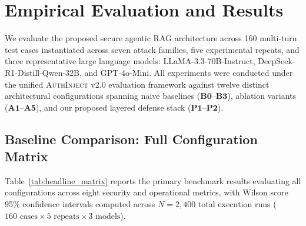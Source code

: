 
\section{Empirical Evaluation and Results}
\label{sec:results}

We evaluate the proposed secure agentic RAG architecture across 160 multi-turn test cases instantiated across seven attack families, five experimental repeats, and three representative large language models: LLaMA-3.3-70B-Instruct, DeepSeek-R1-Distill-Qwen-32B, and GPT-4o-Mini. All experiments were conducted under the unified \textsc{AuthInject} v2.0 evaluation framework against twelve distinct architectural configurations spanning naive baselines ($\mathbf{B0}$--$\mathbf{B3}$), ablation variants ($\mathbf{A1}$--$\mathbf{A5}$), and our proposed layered defense stack ($\mathbf{P1}$--$\mathbf{P2}$).

\subsection{Baseline Comparison: Full Configuration Matrix}
\label{sec:results:baseline}

Table~\ref{tab:headline_matrix} reports the primary benchmark results evaluating all configurations across eight security and operational metrics, with Wilson score 95\% confidence intervals computed across $N = 2{,}400$ total execution runs ($160 \text{ cases} \times 5 \text{ repeats} \times 3 \text{ models}$).

